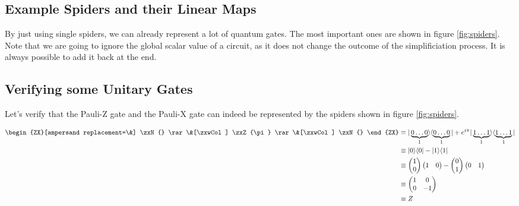 \subsection{Example Spiders and their Linear Maps}

By just using single spiders, we can already represent a lot of quantum gates. The most important ones are shown in figure \ref{fig:spiders}. Note that we are going to ignore the global scalar value of a circuit, as it does not change the outcome of the simplificiation process. It is always possible to add it back at the end.

\subsection*{Verifying some Unitary Gates}

Let's verify that the Pauli-Z gate and the Pauli-X gate can indeed be represented by the spiders shown in figure \ref{fig:spiders}.


\begin{align}
    \begin{ZX}[ampersand replacement=\&]
        \zxN{} \rar \&[\zxwCol] \zxZ{\pi} \rar \&[\zxwCol] \zxN{}
    \end{ZX}
     & \equiv |\underbrace{0\dots 0}_{1}\rangle \langle \underbrace{0\dots0}_{1}| + e^{i\pi}|\underbrace{1\dots1}_{1}\rangle \langle \underbrace{1\dots1}_{1}| \\
     & \equiv
    |0\rangle \langle 0| - |1\rangle \langle 1|                                                                                                                \\
     & \equiv
    \begin{pmatrix}
        1 \\
        0 \\
    \end{pmatrix}
    \begin{pmatrix}
        1 & 0 \\
    \end{pmatrix}
    - \begin{pmatrix}
          0 \\
          1 \\
      \end{pmatrix}
    \begin{pmatrix}
        0 & 1 \\
    \end{pmatrix}                                                                                                                                             \\
     & \equiv
    \begin{pmatrix}
        1 & 0  \\
        0 & -1 \\
    \end{pmatrix}                                                                                                                                             \\
     & \equiv Z
\end{align}


